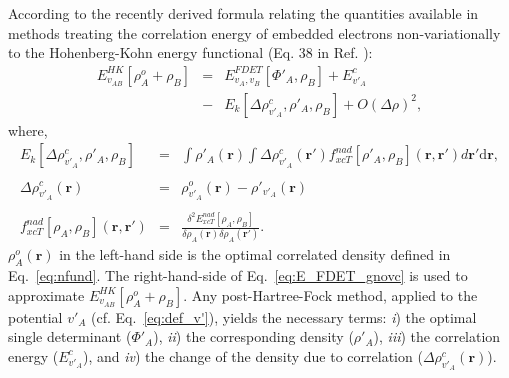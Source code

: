 \documentclass[amsmath,amssymb,preprint,aip,jcp]{revtex4-1}
\newcommand{\nr}[1]{\color{red}#1\color{black}}
\begin{document}
According to the recently derived formula relating the quantities available in methods treating the correlation energy of embedded electrons non-variationally to the Hohenberg-Kohn energy functional (Eq. 38 in Ref. ): 
\begin{eqnarray} \label{eq:E_FDET_gnovc}
 E_{v_{AB}}^{HK}[\rho_A^{o}+\rho_B] &=& E_{v_{A},{v_B}}^{FDET}[\Phi'_{A},\rho_B] + E^{c}_{v'_A} 
 \\ \nonumber
 &-& E_k[\Delta \rho^{c}_{v'_A}, \rho'_A, \rho_B] + O(\Delta\rho)^2, %
 \end{eqnarray}
where,
\begin{eqnarray}
\label{eq:nkernel}
 E_k[\Delta \rho^{c}_{v'_A}, \rho'_A, \rho_B] &=&
  \int \rho'_A(\mathbf{r})  \int \Delta \rho^{c}_{v'_A}(\mathbf{r'}) f^{nad}_{xcT}[\rho'_A, \rho_B](\mathbf{r},\mathbf{r'})d\mathbf{r'}\mathrm{d}\mathbf{r},\\
  \nonumber \\ \label{eq:def_corrdens}
  \Delta \rho^{c}_{v'_A}(\mathbf{r})&=&\rho^{o}_{v'_A}(\mathbf{r})-\rho'_{v'_A}(\mathbf{r})\\
  \nonumber \\
 \label{eq:nf_nad}
 f^{nad}_{xcT}[\rho_A, \rho_B](\mathbf{r},\mathbf{r'}) &=& \frac{\delta^2 E^{nad}_{xcT}[\rho_A, \rho_B]}{\delta \rho_A(\mathbf{r}) \delta \rho_A(\mathbf{r'})}.
\end{eqnarray}
$\rho_A^{o}(\mathbf{r})$ in the left-hand side is the optimal correlated density
defined in Eq.~\ref{eq:nfund}. 
The right-hand-side of Eq.~\ref{eq:E_FDET_gnovc} is used to approximate $E_{v_{AB}}^{HK}[\rho_A^{o}+\rho_B]$.
\nr{Any post-Hartree-Fock method, applied to the potential $v'_A$ (cf. Eq.~\ref{eq:def_v'}), yields the necessary terms: {\it i})
the optimal single determinant ($\Phi'_{A}$), {\it ii}) the corresponding density ($\rho'_{A}$), 
{\it iii}) the correlation energy ($E^{c}_{v'_A}$), and {\it iv}) the change of the density due to correlation ($\Delta \rho^{c}_{v'_A}(\mathbf{r})$).}
\end{document}
